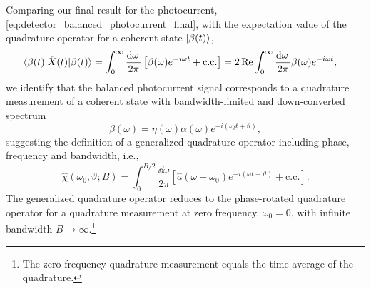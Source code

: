 Comparing our final result for the photocurrent, \cref{eq:detector_balanced_photocurrent_final}, with the expectation value of the quadrature operator for a coherent state $\lvert\beta(t)\rangle$,
\begin{equation}
	\begin{split}
		\bra{\beta(t)}
		\hat{X}(t)
		\ket{\beta(t)}
		&=
		\int_0^\infty
		\frac{\dd{\omega}}{2\pi}
		\left[
			\beta(\omega)
			e^{-i\omega t}
			+
			\text{c.c.}
		\right]
		=
		2\Re
		\int_0^\infty
		\frac{\dd{\omega}}{2\pi}
		\beta(\omega)
		e^{-i\omega t}
		,
	\end{split}
\end{equation}
we identify that the balanced photocurrent signal corresponds to a quadrature measurement of a coherent state with bandwidth-limited and down-converted spectrum
\begin{equation}
	\beta(\omega)
	=
	\eta(\omega)
	\alpha(\omega)
	e^{-i(\omega_lt+\vartheta)}
	,
\end{equation}
suggesting the definition of a generalized quadrature operator including phase, frequency and bandwidth, i.e.,
\begin{equation}
	\hat{\chi}(\omega_0,\vartheta;B)
	=
	\int_0^{B/2}\frac{\dd{\omega}}{2\pi}
	\left[
		\hat{a}(\omega+\omega_0)
		e^{-i(\omega t+\vartheta)}
		+
		\text{c.c.}
	\right]
	.
	\label{eq:quadrature_operator_generalized}
\end{equation}
The generalized quadrature operator reduces to the phase-rotated quadrature operator for a quadrature measurement at zero frequency, $\omega_0=0$, with infinite bandwidth $B\to\infty$.\footnote{The zero-frequency quadrature measurement equals the time average of the quadrature.}